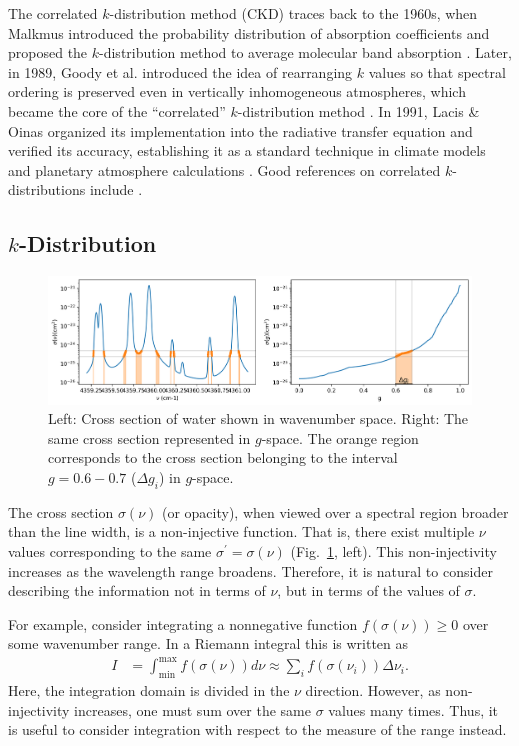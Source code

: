The correlated $k$-distribution method (CKD) traces back to the 1960s, when Malkmus introduced the probability distribution of absorption coefficients and proposed the $k$-distribution method to average molecular band absorption \cite{malkmus1967random}.  
Later, in 1989, Goody et al. introduced the idea of rearranging $k$ values so that spectral ordering is preserved even in vertically inhomogeneous atmospheres, which became the core of the ``correlated'' $k$-distribution method \cite{1989JQSRT..42..539G}.  
In 1991, Lacis \& Oinas organized its implementation into the radiative transfer equation and verified its accuracy, establishing it as a standard technique in climate models and planetary atmosphere calculations \cite{1991JGR....96.9027L}.  
Good references on correlated $k$-distributions include \cite{liou2002introduction}.

\subsection*{$k$-Distribution}

\begin{figure}[b]
    \centering
    \includegraphics[width=1.0\linewidth]{fig/ckd/corrk_test.png}
    \caption{Left: Cross section of water shown in wavenumber space. Right: The same cross section represented in $g$-space. The orange region corresponds to the cross section belonging to the interval $g=0.6-0.7$ ($\Delta g_i$) in $g$-space.}
    \label{fig:ckd_fig1}
\end{figure}

The cross section $\sigma(\nu)$ (or opacity), when viewed over a spectral region broader than the line width, is a non-injective function. That is, there exist multiple $\nu$ values corresponding to the same $\sigma^\prime = \sigma(\nu)$ (Fig.~\ref{fig:ckd_fig1}, left).  
This non-injectivity increases as the wavelength range broadens.  
Therefore, it is natural to consider describing the information not in terms of $\nu$, but in terms of the values of $\sigma$.  

For example, consider integrating a nonnegative function $f(\sigma(\nu)) \geq 0$ over some wavenumber range.  
In a Riemann integral this is written as
\begin{align}
 I &= \int_\mathrm{min}^\mathrm{max} f(\sigma(\nu)) d \nu \approx  \sum_i f(\sigma(\nu_i)) \Delta \nu_i.
\end{align}
Here, the integration domain is divided in the $\nu$ direction.  
However, as non-injectivity increases, one must sum over the same $\sigma$ values many times.  
Thus, it is useful to consider integration with respect to the measure of the range instead.

